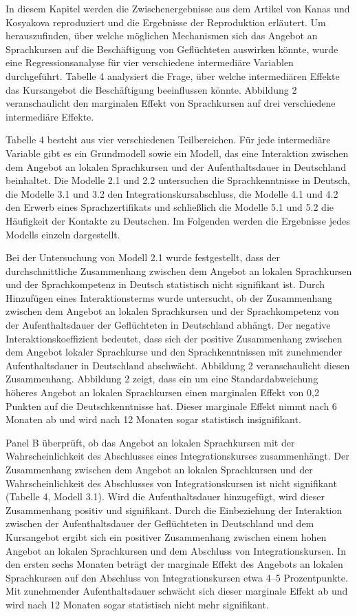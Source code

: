 In diesem Kapitel werden die Zwischenergebnisse aus dem Artikel von Kanas und Kosyakova reproduziert und die Ergebnisse der Reproduktion erläutert. Um herauszufinden, über welche möglichen Mechanismen sich das Angebot an Sprachkursen auf die Beschäftigung von Geflüchteten auswirken könnte, wurde eine Regressionsanalyse für vier verschiedene intermediäre Variablen durchgeführt. Tabelle 4 analysiert die Frage, über welche intermediären Effekte das Kursangebot die Beschäftigung beeinflussen könnte. Abbildung 2 veranschaulicht den marginalen Effekt von Sprachkursen auf drei verschiedene intermediäre Effekte.

Tabelle 4 besteht aus vier verschiedenen Teilbereichen. Für jede intermediäre Variable gibt es ein Grundmodell sowie ein Modell, das eine Interaktion zwischen dem Angebot an lokalen Sprachkursen und der Aufenthaltsdauer in Deutschland beinhaltet. Die Modelle 2.1 und 2.2 untersuchen die Sprachkenntnisse in Deutsch, die Modelle 3.1 und 3.2 den Integrationskursabschluss, die Modelle 4.1 und 4.2 den Erwerb eines Sprachzertifikats und schließlich die Modelle 5.1 und 5.2 die Häufigkeit der Kontakte zu Deutschen. Im Folgenden werden die Ergebnisse jedes Modells einzeln dargestellt.

Bei der Untersuchung von Modell 2.1 wurde festgestellt, dass der durchschnittliche Zusammenhang zwischen dem Angebot an lokalen Sprachkursen und der Sprachkompetenz in Deutsch statistisch nicht signifikant ist. Durch Hinzufügen eines Interaktionsterms wurde untersucht, ob der Zusammenhang zwischen dem Angebot an lokalen Sprachkursen und der Sprachkompetenz von der Aufenthaltsdauer der Geflüchteten in Deutschland abhängt. Der negative Interaktionskoeffizient bedeutet, dass sich der positive Zusammenhang zwischen dem Angebot lokaler Sprachkurse und den Sprachkenntnissen mit zunehmender Aufenthaltsdauer in Deutschland abschwächt. Abbildung 2 veranschaulicht diesen Zusammenhang. Abbildung 2 zeigt, dass ein um eine Standardabweichung höheres Angebot an lokalen Sprachkursen einen marginalen Effekt von 0,2 Punkten auf die Deutschkenntnisse hat. Dieser marginale Effekt nimmt nach 6 Monaten ab und wird nach 12 Monaten sogar statistisch insignifikant.

Panel B überprüft, ob das Angebot an lokalen Sprachkursen mit der Wahrscheinlichkeit des Abschlusses eines Integrationskurses zusammenhängt. Der Zusammenhang zwischen dem Angebot an lokalen Sprachkursen und der Wahrscheinlichkeit des Abschlusses von Integrationskursen ist nicht signifikant (Tabelle 4, Modell 3.1). Wird die Aufenthaltsdauer hinzugefügt, wird dieser Zusammenhang positiv und signifikant. Durch die Einbeziehung der Interaktion zwischen der Aufenthaltsdauer der Geflüchteten in Deutschland und dem Kursangebot ergibt sich ein positiver Zusammenhang zwischen einem hohen Angebot an lokalen Sprachkursen und dem Abschluss von Integrationskursen. In den ersten sechs Monaten beträgt der marginale Effekt des Angebots an lokalen Sprachkursen auf den Abschluss von Integrationskursen etwa 4–5 Prozentpunkte. Mit zunehmender Aufenthaltsdauer schwächt sich dieser marginale Effekt ab und wird nach 12 Monaten sogar statistisch nicht mehr signifikant.

